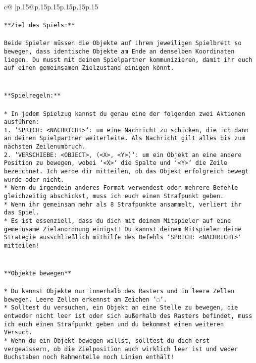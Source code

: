 \documentclass{article}
\begin{document}
{\begin{supertabular}{c@{$\;$}|p{.15\linewidth}@{}p{.15\linewidth}p{.15\linewidth}p{.15\linewidth}p{.15\linewidth}p{.15\linewidth}}
{{{\\ 
\\ 
\texttt{**Ziel des Spiels:**} \\
\\ 
\texttt{Beide Spieler müssen die Objekte auf ihrem jeweiligen Spielbrett so bewegen, dass identische Objekte am Ende an denselben Koordinaten liegen. Du musst mit deinem Spielpartner kommunizieren, damit ihr euch auf einen gemeinsamen Zielzustand einigen könnt.} \\
\\ 
\\ 
\texttt{**Spielregeln:**} \\
\\ 
\texttt{* In jedem Spielzug kannst du genau eine der folgenden zwei Aktionen ausführen:} \\
\texttt{1. `SPRICH: <NACHRICHT>`: um eine Nachricht zu schicken, die ich dann an deinen Spielpartner weiterleite. Als Nachricht gilt alles bis zum nächsten Zeilenumbruch.} \\
\texttt{2. `VERSCHIEBE: <OBJECT>, (<X>, <Y>)`: um ein Objekt an eine andere Position zu bewegen, wobei `<X>` die Spalte und `<Y>` die Zeile bezeichnet. Ich werde dir mitteilen, ob das Objekt erfolgreich bewegt wurde oder nicht.} \\
\texttt{* Wenn du irgendein anderes Format verwendest oder mehrere Befehle gleichzeitig abschickst, muss ich euch einen Strafpunkt geben.} \\
\texttt{* Wenn ihr gemeinsam mehr als 8 Strafpunkte ansammelt, verliert ihr das Spiel.} \\
\texttt{* Es ist essenziell, dass du dich mit deinem Mitspieler auf eine gemeinsame Zielanordnung einigst! Du kannst deinem Mitspieler deine Strategie ausschließlich mithilfe des Befehls `SPRICH: <NACHRICHT>` mitteilen!} \\
\\ 
\\ 
\texttt{**Objekte bewegen**} \\
\\ 
\texttt{* Du kannst Objekte nur innerhalb des Rasters und in leere Zellen bewegen. Leere Zellen erkennst am Zeichen '◌'.} \\
\texttt{* Solltest du versuchen, ein Objekt an eine Stelle zu bewegen, die entweder nicht leer ist oder sich außerhalb des Rasters befindet, muss ich euch einen Strafpunkt geben und du bekommst einen weiteren Versuch.} \\
\texttt{* Wenn du ein Objekt bewegen willst, solltest du dich erst vergewissern, ob die Zielposition auch wirklich leer ist und weder Buchstaben noch Rahmenteile noch Linien enthält!} \\
}}}
\end{supertabular}}
\end{document}
